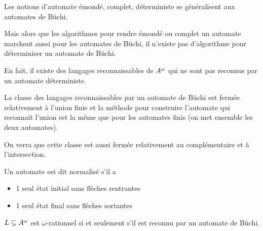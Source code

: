 Les notions d'automate émondé, complet, déterministe se généralisent aux automates de Büchi.


Mais alors que les algorithmes pour rendre émondé ou complet un automate marchent aussi
pour les automates de Büchi, il n'existe pas d'algorithme pour déterminiser un automate de Büchi.

En fait, il existe des langages reconnaissables de $A^{\omega}$ qui ne sont pas reconnus par un automate déterministe.



La classe des langages reconnaissables par un automate de Büchi est fermée relativement à l'union finie
et la méthode pour construire l'automate qui reconnait l'union est la même que pour les automates finis (on met ensemble
les deux automates).

On verra que cette classe est aussi fermée relativement au complémentaire et à l'intersection.


\begin{definition}
	Un automate est dit normalisé s'il a

	\begin{itemize}
		\item 1 seul état initial sans flèches rentrantes
		\item 1 seul état final sans flèches sortantes
	\end{itemize}
\end{definition}

\begin{theorem}
	$L \subseteq A^{\omega}$ est $\omega$-rationnel si et seulement s'il est reconnu par un automate de Büchi.
\end{theorem}

